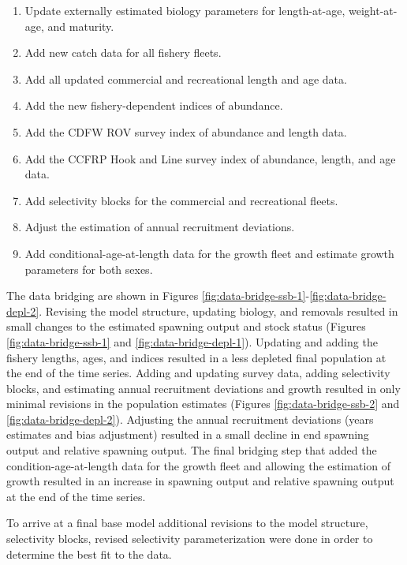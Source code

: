 \documentclass[11pt,
  english,
  letterpaper,
]{article}
\providecommand{\tightlist}{%
  \setlength{\itemsep}{0pt}\setlength{\parskip}{0pt}}
\providecommand{\tightlist}{%
  \setlength{\itemsep}{0pt}\setlength{\parskip}{0pt}}
\begin{document}
\begin{enumerate}
\def\labelenumi{\arabic{enumi}.}
\tightlist
\item
  Update externally estimated biology parameters for length-at-age, weight-at-age, and maturity.
\item
  Add new catch data for all fishery fleets.
\item
  Add all updated commercial and recreational length and age data.
\item
  Add the new fishery-dependent indices of abundance.
\item
  Add the CDFW ROV survey index of abundance and length data.
\item
  Add the CCFRP Hook and Line survey index of abundance, length, and age data.
\item
  Add selectivity blocks for the commercial and recreational fleets.
\item
  Adjust the estimation of annual recruitment deviations.
\item
  Add conditional-age-at-length data for the growth fleet and estimate growth parameters for both sexes.
\end{enumerate}

The data bridging are shown in Figures \ref{fig:data-bridge-ssb-1}-\ref{fig:data-bridge-depl-2}. Revising the model structure, updating biology, and removals resulted in small changes to the estimated spawning output and stock status (Figures \ref{fig:data-bridge-ssb-1} and \ref{fig:data-bridge-depl-1}). Updating and adding the fishery lengths, ages, and indices resulted in a less depleted final population at the end of the time series. Adding and updating survey data, adding selectivity blocks, and estimating annual recruitment deviations and growth resulted in only minimal revisions in the population estimates (Figures \ref{fig:data-bridge-ssb-2} and \ref{fig:data-bridge-depl-2}). Adjusting the annual recruitment deviations (years estimates and bias adjustment) resulted in a small decline in end spawning output and relative spawning output. The final bridging step that added the condition-age-at-length data for the growth fleet and allowing the estimation of growth resulted in an increase in spawning output and relative spawning output at the end of the time series.

To arrive at a final base model additional revisions to the model structure, selectivity blocks, revised selectivity parameterization were done in order to determine the best fit to the data.
\end{document}
